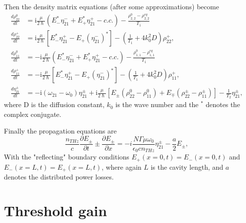 \documentclass[preprint,secnumarabic,amssymb, nobibnotes, aip, prd]{revtex4-1}
\begin{document}
Then the density matrix equations (after some approximations) become 
\begin{align}
\frac{d\rho_{22}^{0}}{dt} &= \mathrm{i}\frac{\mu}{2\hslash}\left(  E_{-}^{\ast}\eta_{21}^{-}+E_{+}^{\ast}\eta_{21}^{+}-c.c.\right) -\frac{\rho_{2,2}^{0}-\rho_{2,2}^{eq}}{T_1} \\
\frac{d\rho_{22}^{+}}{dt} &= \mathrm{i}\frac{\mu}{2\hslash}\left[  E_{-}^{\ast}\eta_{21}^{+}-E_{+}(\eta_{21}^{-})^{\ast}\right] - \left( \frac{1}{T_1}+4k_{0}^{2}D\right)  \rho_{22}^{+},\label{eq:rtpop3grating}\\
\frac{d\rho_{11}^{0}}{dt} &=-\mathrm{i}\frac{\mu}{2\hslash}\left(E_{-}^{\ast}\eta_{21}^{-}+E_{+}^{\ast}\eta_{21}^{+}-c.c.\right) -\frac{\rho_{1,1}^{0}-\rho_{1,1}^{eq}}{T_1} \\
\frac{d\rho_{11}^{+}}{dt} &=-\mathrm{i}\frac{\mu}{2\hslash}\left[E_{-}^{\ast}\eta_{21}^{+}-E_{+}(\eta_{21}^{-})^{\ast}\right] -\left(  \frac{1}{T_1}+4k_{0}^{2}D\right) \rho_{11}^{+}, \label{eq:rtpop2grating} \\
\frac{d\eta_{21}^{\pm}}{dt} & = -\mathrm{i}\left(  \omega_{21}-\omega_{0}\right) \eta_{21}^{\pm}+\mathrm{i}\frac{\mu}{2\hslash}\left[  E_{\pm}(\rho_{22}^{0}-\rho_{11}^{0})+E_{\mp}(\rho_{22}^{\pm}-\rho_{11}^{\pm})\right]-\frac{1}{T_2}\eta_{21}^{\pm},
\end{align}
where D is the diffusion constant, $k_0$ is the wave number and the $^{\ast}$ denotes the complex conjugate.

Finally the propagation equations are
\begin{equation}
\frac{n_{THz}}{c}\frac{\partial E_{\pm}}{\partial {t}}\pm\frac{\partial E_{\pm}}{\partial {x}}=-i\frac{N\Gamma\mu\omega_0}{\epsilon_0 c n_{THz}}\eta_{21}^{\pm}-\frac{a}{2}E_{\pm
}, \label{eq:rtwave}%
\end{equation}	
With the "reflecting" boundary conditions $E_+(x=0,t)=E_-(x=0,t)$ and $E_-(x=L,t)=E_+(x=L,t)$, where again $L$ is the cavity length, and $a$ denotes the distributed power losses. 


\section{Threshold gain}
\end{document}
